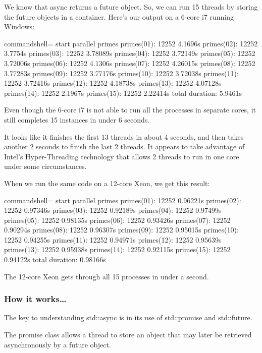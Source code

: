 \begin{itemize}
We know that async returns a future object. So, we can run 15 threads by storing the future objects in a container. Here's our output on a 6-core i7 running Windows:

\begin{tcblisting}{commandshell={}}
start parallel primes
primes(01): 12252 4.1696s
primes(02): 12252 3.7754s
primes(03): 12252 3.78089s
primes(04): 12252 3.72149s
primes(05): 12252 3.72006s
primes(06): 12252 4.1306s
primes(07): 12252 4.26015s
primes(08): 12252 3.77283s
primes(09): 12252 3.77176s
primes(10): 12252 3.72038s
primes(11): 12252 3.72416s
primes(12): 12252 4.18738s
primes(13): 12252 4.07128s
primes(14): 12252 2.1967s
primes(15): 12252 2.22414s
total duration: 5.9461s
\end{tcblisting}

Even though the 6-core i7 is not able to run all the processes in separate cores, it still completes 15 instances in under 6 seconds.

It looks like it finishes the first 13 threads in about 4 seconds, and then takes another 2 seconds to finish the last 2 threads. It appears to take advantage of Intel's Hyper-Threading technology that allows 2 threads to run in one core under some circumstances.

When we run the same code on a 12-core Xeon, we get this result:

\begin{tcblisting}{commandshell={}}
start parallel primes
primes(01): 12252 0.96221s
primes(02): 12252 0.97346s
primes(03): 12252 0.92189s
primes(04): 12252 0.97499s
primes(05): 12252 0.98135s
primes(06): 12252 0.93426s
primes(07): 12252 0.90294s
primes(08): 12252 0.96307s
primes(09): 12252 0.95015s
primes(10): 12252 0.94255s
primes(11): 12252 0.94971s
primes(12): 12252 0.95639s
primes(13): 12252 0.95938s
primes(14): 12252 0.92115s
primes(15): 12252 0.94122s
total duration: 0.98166s
\end{tcblisting}

The 12-core Xeon gets through all 15 processes in under a second.

\end{itemize}

\subsubsection{How it works…}

The key to understanding std::async is in its use of std::promise and std::future.

The promise class allows a thread to store an object that may later be retrieved asynchronously by a future object.

